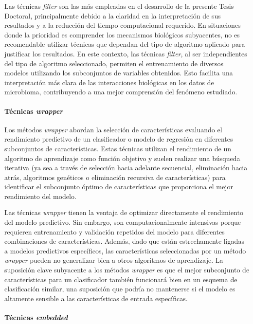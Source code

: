 Las técnicas \textit{filter} son las más empleadas en el desarrollo de la presente Tesis Doctoral, principalmente debido a la claridad en la interpretación de sus resultados y a la reducción del tiempo computacional requerido. En situaciones donde la prioridad es comprender los mecanismos biológicos subyacentes, no es recomendable utilizar técnicas que dependan del tipo de algoritmo aplicado para justificar los resultados. En este contexto, las técnicas \textit{filter}, al ser independientes del tipo de algoritmo seleccionado, permiten el entrenamiento de diversos modelos utilizando los subconjuntos de variables obtenidos. Esto facilita una interpretación más clara de las interacciones biológicas en los datos de microbioma, contribuyendo a una mejor comprensión del fenómeno estudiado.

\paragraph{Técnicas \textit{wrapper}}

Los métodos \textit{wrapper} abordan la selección de características evaluando el rendimiento predictivo de un clasificador o modelo de regresión en diferentes subconjuntos de características. Estas técnicas utilizan el rendimiento de un algoritmo de aprendizaje como función objetivo y suelen realizar una búsqueda iterativa (ya sea a través de selección hacia adelante secuencial, eliminación hacia atrás, algoritmos genéticos o eliminación recursiva de características) para identificar el subconjunto óptimo de características que proporciona el mejor rendimiento del modelo.

Las técnicas \textit{wrapper} tienen la ventaja de optimizar directamente el rendimiento del modelo predictivo. Sin embargo, son computacionalmente intensivas porque requieren entrenamiento y validación repetidos del modelo para diferentes combinaciones de características. Además, dado que están estrechamente ligadas a modelos predictivos específicos, las características seleccionadas por un método \textit{wrapper} pueden no generalizar bien a otros algoritmos de aprendizaje. La suposición clave subyacente a los métodos \textit{wrapper} es que el mejor subconjunto de características para un clasificador también funcionará bien en un esquema de clasificación similar, una suposición que podría no mantenerse si el modelo es altamente sensible a las características de entrada específicas.

\paragraph{Técnicas \textit{embedded}}

